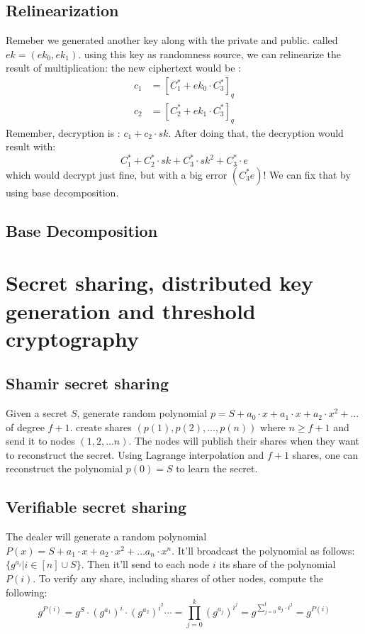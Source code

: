 \section{Relinearization}

Remeber we generated another key along with the private and public.
called $ek=\left(ek_{0},ek_{1}\right)$. using this key as randomness
source, we can relinearize the result of multiplication: the new ciphertext
would be :
\begin{align*}
c_{1} & =\left[C_{1}^{*}+ek_{0}\cdot C_{3}^{*}\right]_{q}\\
c_{2} & =\left[C_{2}^{*}+ek_{1}\cdot C_{3}^{*}\right]_{q}
\end{align*}
Remember, decryption is : $c_{1}+c_{2}\cdot sk$. After doing that,
the decryption would result with: 
\[
C_{1}^{*}+C_{2}^{*}\cdot sk+C_{3}^{*}\cdot sk^{2}+C_{3}^{*}\cdot e
\]
 which would decrypt just fine, but with a big error $\left(C_{3}^{*}e\right)$!
We can fix that by using base decomposition.


\section{Base Decomposition}


\chapter{Secret sharing, distributed key generation and threshold cryptography}
\section{Shamir secret sharing}
Given a secret $S$, generate random polynomial 
$p = S + a_0\cdot x + a_1\cdot x+a_2\cdot x^2+\dots$ of degree $f+1$.
create shares $(p(1),p(2),\dots, p(n))$ where $n\ge f+1$ and send it to nodes $(1,2,...n)$.
The nodes will publish their shares when they want to reconstruct the secret.
Using Lagrange interpolation and $f+1$ shares, one can reconstruct the polynomial $p(0)=S$ to learn the secret.

\section{Verifiable secret sharing}
The dealer will generate a random polynomial $P(x)=S+a_1\cdot x +a_2\cdot x^2 +\dots a_n\cdot x^n$. 
It'll broadcast the polynomial as follows: $\{g^{a_i} | i\in [n]\cup {S}\}$.
Then it'll send to each node $i$ its share of the polynomial $P(i)$. 
To verify any share, including shares of other nodes, compute the following: 
$$ g^{P(i)} =
 g^{S}\cdot (g^{a_1})^{i} \cdot (g^{a_2})^{i^2}\cdots  =
 \prod_{j=0}^{k} (g^{a_j})^{i^j} = 
 g^{\sum_{j=0}^{t} a_j \cdot i^j} = 
 g^{P(i)} $$


